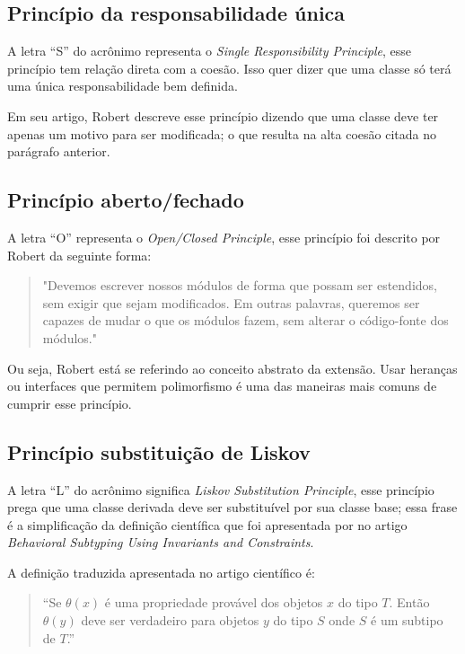 \subsection{Princípio da responsabilidade única}
A letra “S” do acrônimo representa o \textit{Single Responsibility Principle}, esse princípio tem relação direta com a coesão. Isso quer dizer que uma classe só terá uma única responsabilidade bem definida.

Em seu artigo, Robert descreve esse princípio dizendo que uma classe deve ter apenas um motivo para ser modificada; o que resulta na alta coesão citada no parágrafo anterior.

\subsection{Princípio aberto/fechado}
A letra “O” representa o \textit{Open/Closed Principle}, esse princípio foi descrito por Robert da seguinte forma: 

\begin{quotation}
"Devemos escrever nossos módulos de forma que possam ser estendidos, sem exigir que sejam modificados. Em outras palavras, queremos ser capazes de mudar o que os módulos fazem, sem alterar o código-fonte dos módulos."
\end{quotation}

Ou seja, Robert está se referindo ao conceito abstrato da extensão. Usar heranças ou interfaces que permitem polimorfismo é uma das maneiras mais comuns de cumprir esse princípio.

\subsection{Princípio substituição de Liskov}
A letra “L” do acrônimo significa \textit{Liskov Substitution Principle}, esse princípio prega que uma classe derivada deve ser substituível por sua classe base; essa frase é a simplificação da definição científica que foi apresentada por \textcite{liskov} no artigo \textit{Behavioral Subtyping Using Invariants and Constraints}.

A definição traduzida apresentada no artigo científico é:

\begin{quotation}
“Se $\theta(x)$ é uma propriedade provável dos objetos $x$ do tipo $T$. Então $\theta(y)$ deve ser verdadeiro para objetos $y$ do tipo $S$ onde $S$ é um subtipo de $T$.”
\end{quotation}

